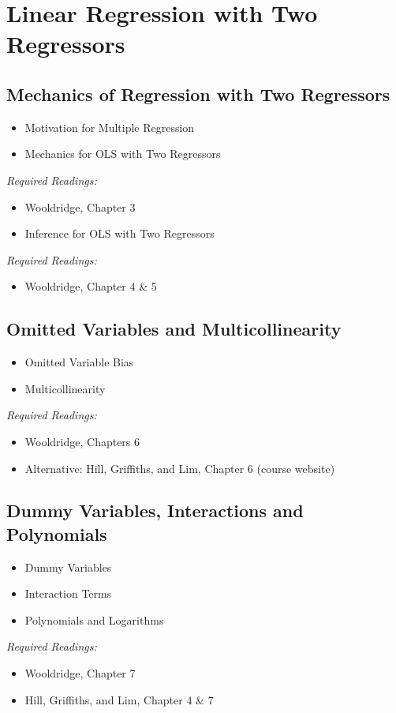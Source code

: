 \documentclass{article}
\begin{document}
\section{Linear Regression with Two Regressors}
\subsection{Mechanics of Regression with Two Regressors}
\begin{itemize}
\item Motivation for Multiple Regression
\item Mechanics for OLS with Two Regressors
\end{itemize}
\textit{Required Readings:} \begin{itemize}
  \item Wooldridge, Chapter 3
\end{itemize}
\begin{itemize}
\item Inference for OLS with Two Regressors
\end{itemize}
\textit{Required Readings:} \begin{itemize}
  \item Wooldridge, Chapter 4 \& 5
\end{itemize}

\subsection{Omitted Variables and Multicollinearity}
\begin{itemize}
\item Omitted Variable Bias
\item Multicollinearity
\end{itemize}
\textit{Required Readings:} \begin{itemize}
  \item Wooldridge, Chapters 6
      \item Alternative: Hill, Griffiths, and Lim, Chapter 6 (course website)
\end{itemize}
\subsection{Dummy Variables, Interactions and Polynomials}
\begin{itemize}
\item Dummy Variables
\item Interaction Terms
\item Polynomials and Logarithms
\end{itemize}
\textit{Required Readings:} \begin{itemize}
  \item Wooldridge, Chapter 7
    \item Hill, Griffiths, and Lim, Chapter 4 \& 7
\end{itemize}
\end{document}
